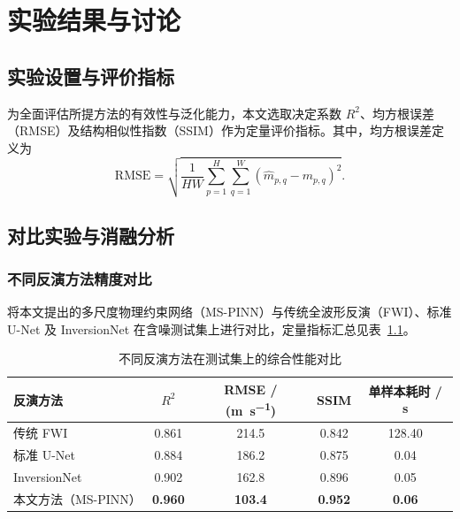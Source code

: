 \chapter{实验结果与讨论}

\section{实验设置与评价指标}

为全面评估所提方法的有效性与泛化能力，本文选取决定系数 $R^2$、均方根误差（RMSE）及结构相似性指数（SSIM）作为定量评价指标。其中，均方根误差定义为
\begin{equation}
  \mathrm{RMSE} = \sqrt{\frac{1}{HW} \sum_{p=1}^{H} \sum_{q=1}^{W} \left( \hat{m}_{p,q} - m_{p,q} \right)^2}.
  \label{eq:rmse}
\end{equation}

\section{对比实验与消融分析}

\subsection{不同反演方法精度对比}

将本文提出的多尺度物理约束网络（MS-PINN）与传统全波形反演（FWI）、标准 U-Net 及 InversionNet 在含噪测试集上进行对比，定量指标汇总见表~\ref{tab:compare}。

\begin{table}[htbp]
  \centering
  \caption{不同反演方法在测试集上的综合性能对比}
  \label{tab:compare}
  \begin{tabular}{lcccc}
    \toprule
    反演方法 & $R^2$ & RMSE / (\si{\meter\per\second}) & SSIM & 单样本耗时 / \si{\second} \\
    \midrule
    传统 FWI\cite{tarantola2005inverse}   & 0.861 & 214.5 & 0.842 & 128.40 \\
    标准 U-Net\cite{li2022dl}              & 0.884 & 186.2 & 0.875 &   0.04 \\
    InversionNet\cite{wu2019inversionnet}  & 0.902 & 162.8 & 0.896 &   0.05 \\
    本文方法（MS-PINN）                    & \textbf{0.960} & \textbf{103.4} & \textbf{0.952} & \textbf{0.06} \\
    \bottomrule
  \end{tabular}
\end{table}

